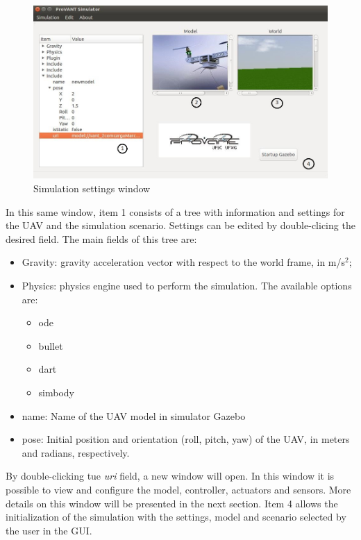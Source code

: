 \begin{figure}[!ht]
	\centering
	\includegraphics[width=500pt]{figuras/tela_inicial.jpg}
	\caption{Simulation settings window}
	\label{tela_inicial.jpg}
\end{figure}

In this same window, item 1 consists of a tree with information and settings for the UAV and the simulation scenario. Settings can be edited by double-clicing the desired field. The main fields of this tree are:

\begin{itemize}
	\item Gravity: gravity acceleration vector with respect to the world frame, in m/s$^2$;
	\item Physics: physics engine used to perform the simulation. The available options are:
	\begin{itemize}
		\setlength{\itemsep}{1pt}
		\setlength{\parskip}{0pt}
		\setlength{\parsep}{0pt}
		\item ode
		\item bullet
		\item dart
		\item simbody
	\end{itemize}
	\item name: Name of the UAV model in simulator Gazebo
	\item pose: Initial position and orientation (roll, pitch, yaw) of the UAV, in meters and radians, respectively.
\end{itemize}

\noindent By double-clicking tue \textit{uri} field, a new window will open. In this window it is possible to view and configure the model, controller, actuators and sensors. More details on this window will be presented in the next section. Item 4 allows the initialization of the simulation with the settings, model and scenario selected by the user in the GUI.

